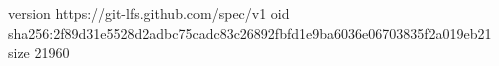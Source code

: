 version https://git-lfs.github.com/spec/v1
oid sha256:2f89d31e5528d2adbc75cadc83c26892fbfd1e9ba6036e06703835f2a019eb21
size 21960
